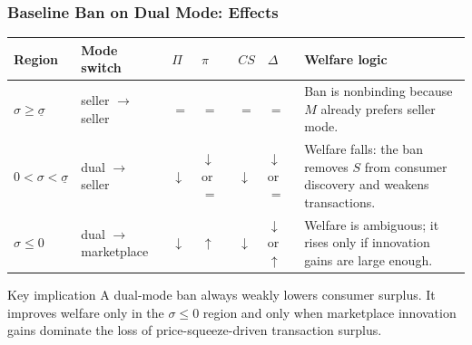 \begin{frame}
  \frametitle{Baseline Ban on Dual Mode: Effects}
  \scriptsize

  \begin{table}
    \centering
    \renewcommand{\arraystretch}{1.22}
    \begin{tabularx}{\textwidth}{@{}p{2.4cm}p{2.1cm}p{1.1cm}p{1.1cm}p{1.1cm}p{1.1cm}X@{}}
      \toprule
      Region & Mode switch & $\Pi$ & $\pi$ & $CS$ & $\Delta$ & Welfare logic \\
      \midrule
      $\sigma\geq\underline{\sigma}$
        & seller $\to$ seller
        & $=$ & $=$ & $=$ & $=$
        & Ban is nonbinding because $M$ already prefers seller mode. \\
      $0<\sigma<\underline{\sigma}$
        & dual $\to$ seller
        & $\downarrow$ & $\downarrow$ or $=$ & $\downarrow$ & $\downarrow$ or $=$
        & Welfare falls: the ban removes $S$ from consumer discovery and weakens transactions. \\
      $\sigma\leq0$
        & dual $\to$ marketplace
        & $\downarrow$ & $\uparrow$ & $\downarrow$ & $\downarrow$ or $\uparrow$
        & Welfare is ambiguous; it rises only if innovation gains are large enough. \\
      \bottomrule
    \end{tabularx}
  \end{table}

  \begin{alertblock}{Key implication}
    A dual-mode ban always weakly lowers consumer surplus. It improves welfare
    only in the $\sigma\leq0$ region and only when marketplace innovation
    gains dominate the loss of price-squeeze-driven transaction surplus.
  \end{alertblock}
\end{frame}

